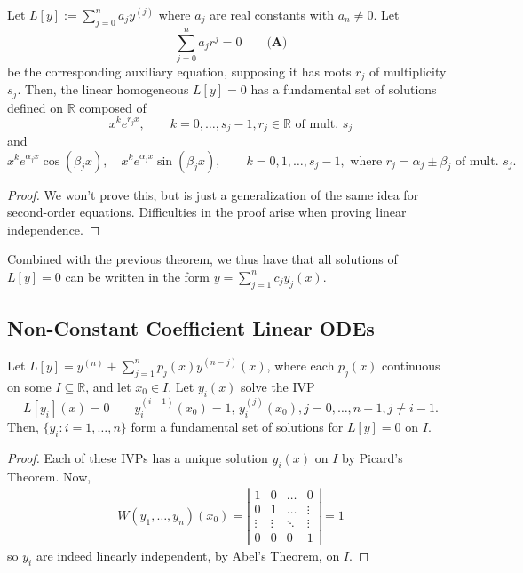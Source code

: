 \begin{theorem}
    Let $L[y] := \sum_{j=0}^n a_jy^{(j)}$ where $a_j$ are real constants with $a_n \neq 0$. Let $$
    \sum_{j=0}^n a_j r^j = 0\qquad \textbf{(A)}
    $$
    be the corresponding auxiliary equation, supposing it has roots $r_j$ of multiplicity $s_j$. Then, the linear homogeneous $L[y] = 0$ has a fundamental set of solutions defined on $\mathbb{R}$ composed of \[
        x^ke^{r_j x},\qquad k = 0, \dots, s_j - 1, r_j \in \mathbb{R} \text{ of mult. } s_j
    \]
    and \[
    x^k e^{\alpha_j x}\cos (\beta_j x),\quad x^k e^{\alpha_j x}\sin (\beta_j x), \qquad k = 0, 1, \dots, s_j - 1, \text{ where } r_j = \alpha_j \pm \beta_j \text{ of mult. } s_j.
    \]
\end{theorem}
\begin{proof}
    We won't prove this, but is just a generalization of the same idea for second-order equations. Difficulties in the proof arise when proving linear independence.
\end{proof}

\begin{remark}
    Combined with the previous theorem, we thus have that all solutions of $L[y] = 0$ can be written in the form $y = \sum_{j=1}^n c_j y_j(x)$.
\end{remark}

\subsection{Non-Constant Coefficient Linear ODEs}
\begin{theorem}
    Let $L[y] = y^{(n)} + \sum_{j=1}^n p_j(x)y^{(n-j)}(x)$, where each $p_j(x)$ continuous on some $I \subseteq \mathbb{R}$, and let $x_0 \in I$. Let $y_i(x)$ solve the IVP \[
    L[y_i](x) = 0 \qquad  y_i^{(i-1)}(x_0) = 1, \, y_i^{(j)}(x_0), j = 0, \dots, n -1, j \neq i - 1.
    \]
    Then, $\{y_i : i = 1, \dots, n\}$ form a fundamental set of solutions for $L[y] = 0$ on $I$.
\end{theorem}

\begin{proof}
    Each of these IVPs has a unique solution $y_i(x)$ on $I$ by Picard's Theorem. Now, \begin{align*}
        W(y_1, \dots, y_n)(x_0) = \left|\begin{matrix}
            1 & 0 & \dots & 0\\
            0 & 1 & \dots & \vdots \\
            \vdots & \vdots & \ddots & \vdots \\
            0 & 0 & 0 & 1
        \end{matrix}\right|  = 1
    \end{align*}
    so $y_i$ are indeed linearly independent, by Abel's Theorem, on $I$.
\end{proof}

